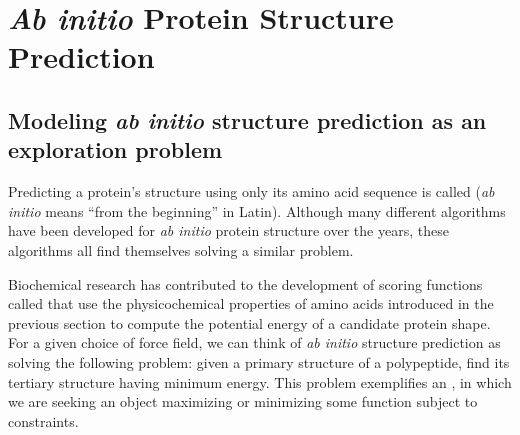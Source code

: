 \FloatBarrier
{}

\section{\textit{Ab initio} Protein Structure Prediction}
\label{sec:ab_initio}


\subsection{Modeling \textit{ab initio} structure prediction as an exploration problem}

Predicting a protein’s structure using only its amino acid sequence is called  (\textit{ab initio} means “from the beginning” in Latin). Although many different algorithms have been developed for \textit{ab initio} protein structure over the years, these algorithms all find themselves solving a similar problem.

Biochemical research has contributed to the development of scoring functions called  that use the physicochemical properties of amino acids introduced in the previous section to compute the potential energy of a candidate protein shape. For a given choice of force field, we can think of \textit{ab initio} structure prediction as solving the following problem: given a primary structure of a polypeptide, find its tertiary structure having minimum energy. This problem exemplifies an , in which we are seeking an object maximizing or minimizing some function subject to constraints.

